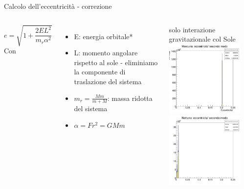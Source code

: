         \begin{frame}{Calcolo dell'eccentricità - correzione}
            \begin{columns}
                    \begin{equation}
                        e = \sqrt{1+\frac{2EL^2}{m_r\alpha^2}}
                    \end{equation}
                    Con
                    \begin{itemize}
                        \item E: energia orbitale*
                        \item L: momento angolare rispetto al sole - eliminiamo la componente di traslazione del sistema
                        \item $m_r=\frac{Mm}{m+M}$: massa ridotta del sistema
                        \item $\alpha = F r^2 = GMm$
                    \end{itemize}
                    \small *solo interazione gravitazionale col Sole
                    \centering
                    \includegraphics[width=.9\textwidth, height=3.75cm]{6_ecc/mer_ecc_500_3600.jpg}
                    \includegraphics[width=.9\textwidth, height=3.75cm]{6_ecc/net_ecc_500_60.jpg}
                    \label{cfr::bug3} 
            \end{columns}
        \end{frame}
